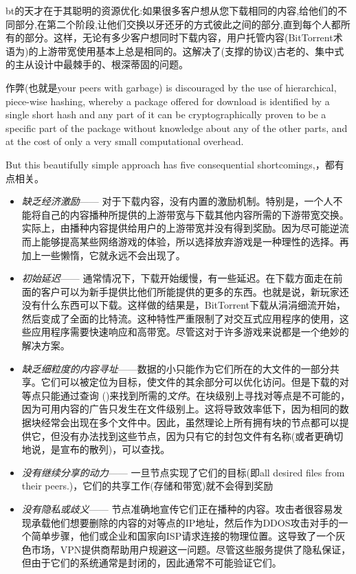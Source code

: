 bt的天才在于其聪明的资源优化\cite{cohen2003incentives}:如果很多客户想从您下载相同的内容,给他们的不同部分,在第二个阶段,让他们交换以牙还牙的方式彼此之间的部分,直到每个人都所有的部分。这样，无论有多少客户想同时下载内容，用户托管内容(BitTorrent术语为)的上游带宽使用基本上总是相同的。这解决了(支撑的协议)古老的、集中式的主从设计中最棘手的、根深蒂固的问题。

作弊(也就是\feeding your peers with garbage) is discouraged by the use of hierarchical, piece-wise hashing, whereby a package offered for download is identified by a single short hash and any part of it can be cryptographically proven to be a specific part of the package without knowledge about any of the other parts, and at the cost of only a very small computational overhead. 

But this beautifully simple approach has five consequential shortcomings,\cite{locher2006free,piatek2007incentives}，都有点相关。

\begin{itemize}
\item \emph{缺乏经济激励}—— 
对于下载内容，没有内置的激励机制。特别是，一个人不能将自己的内容播种所提供的上游带宽与下载其他内容所需的下游带宽交换。实际上，由播种内容提供给用户的上游带宽并没有得到奖励。因为尽可能逆流而上能够提高某些网络游戏的体验，所以选择放弃游戏是一种理性的选择。再加上一些懒惰，它就永远不会出现了。

\item \emph{初始延迟}—— 
 通常情况下，下载开始缓慢，有一些延迟。在下载方面走在前面的客户可以为新手提供比他们所能提供的更多的东西。也就是说，新玩家还没有什么东西可以下载。这样做的结果是，BitTorrent下载从涓涓细流开始，然后变成了全面的比特流。这种特性严重限制了对交互式应用程序的使用，这些应用程序需要快速响应和高带宽。尽管这对于许多游戏来说都是一个绝妙的解决方案。
 
\item \emph{缺乏细粒度的内容寻址}——数据的小只能作为它们所在的大文件的一部分共享。它们可以被定位为目标，使文件的其余部分可以优化访问。但是下载的对等点只能通过查询 ()来找到所需的\emph{文件}。在块级别上寻找对等点是不可能的，因为可用内容的广告只发生在文件级别上。这将导致效率低下，因为相同的数据块经常会出现在多个文件中。因此，虽然理论上所有拥有块的节点都可以提供它，但没有办法找到这些节点，因为只有它的封包文件有名称(或者更确切地说，是宣布的散列)，可以查找。

\item \emph{没有继续分享的动力}——
一旦节点实现了它们的目标(即\retrieving all desired files from their peers.)，它们的共享工作(存储和带宽)就不会得到奖励\item \emph{没有隐私或歧义}——
节点准确地宣传它们正在播种的内容。攻击者很容易发现承载他们想要删除的内容的对等点的IP地址，然后作为DDOS攻击对手的一个简单步骤，他们或企业和国家向ISP请求连接的物理位置。这导致了一个灰色市场，VPN提供商帮助用户规避这一问题。尽管这些服务提供了隐私保证，但由于它们的系统通常是封闭的，因此通常不可能验证它们。 
\end{itemize}

